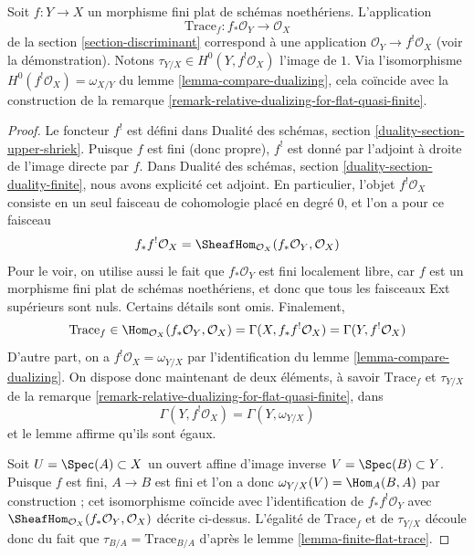 \begin{lemma}
\label{lemma-compare-trace}
Soit $f : Y \to X$ un morphisme fini plat de schémas noethériens.
L'application
$$
\text{Trace}_f : f_*\mathcal{O}_Y \longrightarrow \mathcal{O}_X
$$
de la section \ref{section-discriminant}
correspond à une application $\mathcal{O}_Y \to f^!\mathcal{O}_X$ (voir la démonstration).
Notons $\tau_{Y/X} \in H^0(Y, f^!\mathcal{O}_X)$ l'image de $1$.
Via l'isomorphisme $H^0(f^!\mathcal{O}_X) = \omega_{X/Y}$ du
lemme \ref{lemma-compare-dualizing},
cela coïncide avec la construction de la
remarque \ref{remark-relative-dualizing-for-flat-quasi-finite}.
\end{lemma}

\begin{proof}
Le foncteur $f^!$ est défini dans
Dualité des schémas, section \ref{duality-section-upper-shriek}.
Puisque $f$ est fini (donc propre), $f^!$ est donné par
l'adjoint à droite de l'image directe par $f$. Dans
Dualité des schémas, section \ref{duality-section-duality-finite},
nous avons explicité cet adjoint. En particulier,
l'objet $f^!\mathcal{O}_X$ consiste en un seul
faisceau de cohomologie placé en degré $0$, et l'on a pour ce faisceau
$$
f_*f^!\mathcal{O}_X =
\SheafHom_{\mathcal{O}_X}(f_*\mathcal{O}_Y, \mathcal{O}_X)
$$
Pour le voir, on utilise aussi le fait que $f_*\mathcal{O}_Y$ est fini localement libre,
car $f$ est un morphisme fini plat de schémas noethériens,
et donc que tous les faisceaux Ext supérieurs sont nuls. Certains détails sont omis.
Finalement,
$$
\text{Trace}_f \in
\Hom_{\mathcal{O}_X}(f_*\mathcal{O}_Y, \mathcal{O}_X) =
\Gamma(X, f_*f^!\mathcal{O}_X) =
\Gamma(Y, f^!\mathcal{O}_X)
$$
D'autre part, on a $f^!\mathcal{O}_X = \omega_{Y/X}$
par l'identification du lemme \ref{lemma-compare-dualizing}.
On dispose donc maintenant de deux éléments, à savoir $\text{Trace}_f$
et $\tau_{Y/X}$ de la
remarque \ref{remark-relative-dualizing-for-flat-quasi-finite}, dans
$$
\Gamma(Y, f^!\mathcal{O}_X) = \Gamma(Y, \omega_{Y/X})
$$
et le lemme affirme qu'ils sont égaux.

\medskip\noindent
Soit $U = \Spec(A) \subset X$ un ouvert affine d'image inverse
$V = \Spec(B) \subset Y$. Puisque $f$ est fini,
$A \to B$ est fini et l'on a donc $\omega_{Y/X}(V) = \Hom_A(B,A)$
par construction ; cet isomorphisme coïncide avec l'identification
de $f_*f^!\mathcal{O}_Y$ avec
$\SheafHom_{\mathcal{O}_X}(f_*\mathcal{O}_Y, \mathcal{O}_X)$ décrite
ci-dessus. L'égalité de $\text{Trace}_f$ et de $\tau_{Y/X}$
découle donc du fait que $\tau_{B/A} = \text{Trace}_{B/A}$
d'après le lemme \ref{lemma-finite-flat-trace}.
\end{proof}








